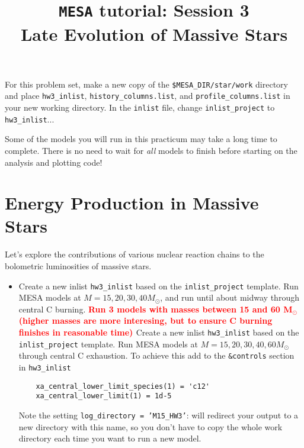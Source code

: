 \documentclass[11pt,a4paper]{article}
\newcommand{\todo}[1]{\textbf{\textcolor{red}{#1}}}
\begin{document}
\title{
    \textbf{\texttt{MESA} tutorial:  Session 3} \\
    \textbf{\Large Late Evolution of Massive Stars}
}
\date{}
\maketitle
\vspace{-1cm}

For this problem set, make a new copy of the \texttt{\$MESA\_DIR/star/work} 
directory and place \texttt{hw3\_inlist}, \texttt{history\_columns.list}, and \texttt{profile\_columns.list} in your new working directory.
In the \texttt{inlist} file, change \texttt{inlist\_project} to \texttt{hw3\_inlist}...

\begin{tcolorbox}[protipbox]
Some of the models you will run in this practicum may take a long time to complete.
There is no need to wait for \textit{all} models to finish before starting on the analysis and plotting code!
\end{tcolorbox}

\section{Energy Production in Massive Stars}

Let's explore the contributions of various nuclear reaction chains to the bolometric luminosities of massive stars. 

\begin{itemize}
    \item  Create a new inlist \texttt{hw3\_inlist} based on the \texttt{inlist\_project} template.
    Run MESA models at $M = 15, 20, 30, 40 M_\odot$, and run until about midway through central C burning.
    \todo{Run 3 models with masses between 15 and 60 M$_\odot$ (higher masses are more interesing, but to ensure C burning finishes in reasonable time) }
     Create a new inlist \texttt{hw3\_inlist} based on the \texttt{inlist\_project} template.
    Run MESA models at $M = 15, 20, 30, 40, 60 M_\odot$ through central C exhaustion.
    To achieve this add to the \texttt{\&controls} section in \texttt{hw3\_inlist}
        \begin{lstlisting}
    xa_central_lower_limit_species(1) = 'c12'
    xa_central_lower_limit(1) = 1d-5
        \end{lstlisting}
    
    Note the setting \texttt{log\_directory = 'M15\_HW3'}: will redirect your output to a new directory with this name, so you don't have to copy the whole work directory each time you want to run a new model.
    
\end{itemize}
\end{document}
